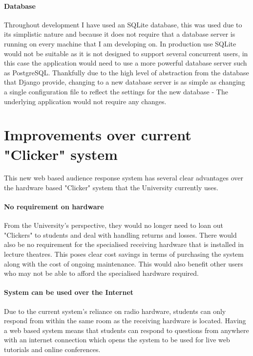\documentclass[10pt]{report}
\begin{document}
	\paragraph{Database}
	Throughout development I have used an SQLite database, this was used due to its simplistic nature and
	because it does not require that a database server is running on every machine that I am developing
	on.  In production use SQLite would not be suitable as it is not designed to support several
	concurrent users, in this case the application would need to use a more powerful database server such
	as PostgreSQL.  Thankfully due to the high level of abstraction from the database that Django provide,
	changing to a new database server is as simple as changing a single configuration file to reflect the
	settings for the new database - The underlying application would not require any changes.
	
	\section*{Improvements over current "Clicker" system}
	\paragraph{}
	This new web based audience response system has several clear advantages over the hardware based
	"Clicker" system that the University currently uses.
	
	\paragraph{No requirement on hardware}
	From the University's perspective, they would no longer need to loan out "Clickers" to students and
	deal with handling returns and losses.  There would also be no requirement for the specialised
	receiving hardware that is installed in lecture theatres.  This poses clear cost savings in terms of
	purchasing the system along with the cost of ongoing maintenance.  This would also benefit other users
	who may not be able to afford the specialised hardware required.
	
	\paragraph{System can be used over the Internet}
	Due to the current system's reliance on radio hardware, students can only respond from within the same
	room as the receiving hardware is located. Having a web based system means that students can respond
	to questions from anywhere with an internet connection which opens the system to be used for live web
	tutorials and online conferences.
	
\end{document}
